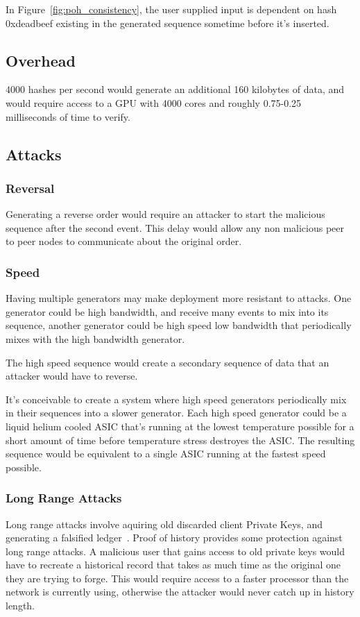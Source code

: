 \documentclass[12pt]{article}
\begin{document}
In Figure~\ref{fig:poh_consistency}, the user supplied input is dependent on hash 0xdeadbeef existing in the generated sequence sometime before it’s inserted.
\subsection{Overhead}
4000 hashes per second would generate an additional 160 kilobytes of data, and would require access to a GPU with 4000 cores and roughly 0.75-0.25 milliseconds of time to verify.

\subsection{Attacks}
\subsubsection{Reversal}
 Generating a reverse order would require an attacker to start the malicious sequence after the second event. This delay would allow any non malicious peer to peer nodes to communicate about the original order.

\subsubsection{Speed}
Having multiple generators may make deployment more resistant to attacks. One generator could be high bandwidth, and receive many events to mix into its sequence, another generator could be high speed low bandwidth that periodically mixes with the high bandwidth generator.

The high speed sequence would create a secondary sequence of data that an attacker would have to reverse.

It's conceivable to create a system where high speed generators periodically mix in their sequences into a slower generator.  Each high speed generator could be a liquid helium cooled ASIC that's running at the lowest temperature possible for a short amount of time before temperature stress destroyes the ASIC.  The resulting sequence would be equivalent to a single ASIC running at the fastest speed possible.

\subsubsection{Long Range Attacks}

Long range attacks involve aquiring old discarded client Private Keys, and generating a falsified ledger~\cite{casper}.  Proof of history provides some protection against long range attacks. A malicious user that gains access to old private keys would have to recreate a historical record that takes as much time as the original one they are trying to forge. This would require access to a faster processor than the network is currently using, otherwise the attacker would never catch up in history length.
\end{document}
